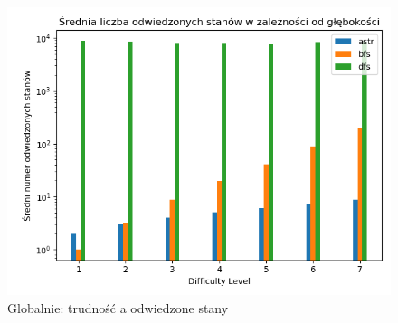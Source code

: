\documentclass{classrep}
\begin{document}
\begin{figure}[p] \centering
 \includegraphics[width=0.9\linewidth]{./pic/glob_vstd_c_vs_diff.png}
 \caption{Globalnie: trudność a odwiedzone stany}
\end{figure}
\end{document}
